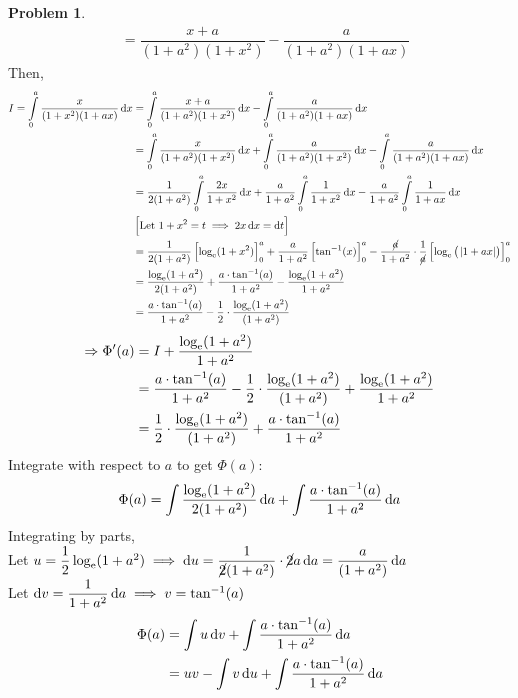 \documentclass[14]{article}
\theoremstyle{definition}
\newtheorem{prob}{Problem}
\theoremstyle{case}
\begin{document}
\begin{prob}
\begin{align*}
&= \dfrac{x+a}{(1+a^2)(1+x^2)} - \dfrac{a}{(1+a^2)(1+ax)}
\end{align*}
Then,
\begin{align*}
I = \int\limits_0^a \dfrac{x}{(1+x^2)(1+ax)} \dif x &= \int\limits_0^a \dfrac{x+a}{(1+a^2)(1+x^2)} \dif x - \int\limits_0^a \dfrac{a}{(1+a^2)(1+ax)} \dif x\\
&= \int\limits_0^a \dfrac{x}{(1+a^2)(1+x^2)} \dif x + \int\limits_0^a \dfrac{a}{(1+a^2)(1+x^2)} \dif x - \int\limits_0^a \dfrac{a}{(1+a^2)(1+ax)} \dif x\\
&= \dfrac{1}{2(1+a^2)}\int\limits_0^a \dfrac{2x}{1+x^2} \dif x + \dfrac{a}{1+a^2}\int\limits_0^a \dfrac{1}{1+x^2} \dif x - \dfrac{a}{1+a^2} \int\limits_0^a \dfrac1{1+ax} \dif x\\
& \left[\text{Let } 1 + x^2 = t \implies 2x \dif x = \dif t\right]\\
&= \dfrac1{2(1+a^2)} \left[ \log_{\rm e}(1+x^2) \right]_0^a + \dfrac{a}{1+a^2} \left[ \tan^{-1}(x) \right]_0^a - \dfrac{\cancel{a}}{1+a^2} \cdot \dfrac1{\cancel{a}} \left[ \log_{\rm e}\left(\;\abs{1+ax}\right) \right]_0^a\\
&= \dfrac{\log_{\rm e}(1+a^2)}{2(1+a^2)} + \dfrac{a \cdot \tan^{-1}(a)}{1+a^2} - \dfrac{\log_{\rm e}(1+a^2)}{1+a^2}\\
&= \dfrac{a \cdot \tan^{-1}(a)}{1+a^2} - \dfrac12 \cdot \dfrac{\log_{\rm e}(1+a^2)}{(1+a^2)} 
\end{align*}
\begin{align*}
\Rightarrow \Phi'(a) &= I + \dfrac{\log_{\rm e}(1+a^2)}{1+a^2}\\
&= \dfrac{a \cdot \tan^{-1}(a)}{1+a^2} - \dfrac12 \cdot \dfrac{\log_{\rm e}(1+a^2)}{(1+a^2)} + \dfrac{\log_{\rm e}(1+a^2)}{1+a^2}\\
&= \dfrac12 \cdot \dfrac{\log_{\rm e}(1+a^2)}{(1+a^2)} + \dfrac{a \cdot \tan^{-1}(a)}{1+a^2}
\end{align*}
Integrate with respect to $a$ to get $\Phi(a)$:
\[\Phi(a) = \int \dfrac{\log_{\rm e}(1+a^2)}{2(1+a^2)} \dif a + \int \dfrac{a \cdot \tan^{-1}(a)}{1+a^2} \dif a\]
Integrating by parts,\\
Let $u = \dfrac12 \log_{\rm e}(1+a^2) \implies \dif u =\dfrac1{\cancel{2} (1+a^2)} \cdot \cancel{2}a \dif a = \dfrac{a}{(1+a^2)} \dif a$\\
Let $\dif v = \dfrac1{1+a^2} \dif a \implies v = \tan^{-1}(a)$
\begin{align*}
\Phi(a) &= \int u \dif v + \int \dfrac{a \cdot \tan^{-1}(a)}{1+a^2} \dif a\\
&= uv - \int v \dif u + \int \dfrac{a \cdot \tan^{-1}(a)}{1+a^2} \dif a\\

\end{align*}
\end{prob}
\end{document}
